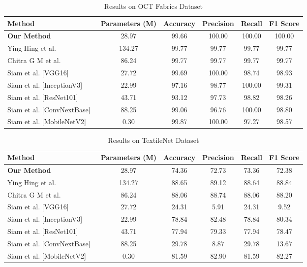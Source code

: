 \begin{table}[h]
\centering
\caption{Results on OCT Fabrics Dataset}
\label{tab:oct_results}
\begin{adjustbox}{max width=\textwidth}
\begin{tabular}{lccccc}
\toprule
\textbf{Method} & \textbf{Parameters (M)} & \textbf{Accuracy} & \textbf{Precision} & \textbf{Recall} & \textbf{F1 Score} \\
\midrule
\textbf{Our Method} & 28.97 & 99.66 & 100.00 & 100.00 & 100.00 \\
Ying Hing et al.~\cite{hong2024research} & 134.27 & 99.77 & 99.77 & 99.77 & 99.77 \\
Chitra G M et al.~\cite{chitra2023fabric} & 86.24 & 99.77 & 99.77 & 99.77 & 99.77 \\
Siam et al. [VGG16]~\cite{siam2023textilenet} & 27.72 & 99.69 & 100.00 & 98.74 & 98.93 \\
Siam et al. [InceptionV3]~\cite{siam2023textilenet} & 22.99 & 97.16 & 98.77 & 100.00 & 99.31 \\
Siam et al. [ResNet101]~\cite{siam2023textilenet} & 43.71 & 93.12 & 97.73 & 98.82 & 98.26 \\
Siam et al. [ConvNextBase]~\cite{siam2023textilenet} & 88.25 & 99.06 & 96.76 & 100.00 & 98.80 \\
Siam et al. [MobileNetV2]~\cite{siam2023textilenet} & 0.30 & 99.87 & 100.00 & 97.27 & 98.57 \\
\bottomrule
\end{tabular}
\end{adjustbox}
\end{table}

\begin{table}[h]
\centering
\caption{Results on TextileNet Dataset}
\label{tab:textilenet_results}
\begin{adjustbox}{max width=\textwidth}
\begin{tabular}{lccccc}
\toprule
\textbf{Method} & \textbf{Parameters (M)} & \textbf{Accuracy} & \textbf{Precision} & \textbf{Recall} & \textbf{F1 Score} \\
\midrule
\textbf{Our Method} & 28.97 & 74.36 & 72.73 & 73.36 & 72.38 \\
Ying Hing et al.~\cite{hong2024research} & 134.27 & 88.65 & 89.12 & 88.64 & 88.84 \\
Chitra G M et al.~\cite{chitra2023fabric} & 86.24 & 88.06 & 88.74 & 88.06 & 88.20 \\
Siam et al. [VGG16]~\cite{siam2023textilenet} & 27.72 & 24.31 & 5.91 & 24.31 & 9.52 \\
Siam et al. [InceptionV3]~\cite{siam2023textilenet} & 22.99 & 78.84 & 82.48 & 78.84 & 80.34 \\
Siam et al. [ResNet101]~\cite{siam2023textilenet} & 43.71 & 77.94 & 79.33 & 77.94 & 78.47 \\
Siam et al. [ConvNextBase]~\cite{siam2023textilenet} & 88.25 & 29.78 & 8.87 & 29.78 & 13.67 \\
Siam et al. [MobileNetV2]~\cite{siam2023textilenet} & 0.30 & 81.59 & 82.90 & 81.59 & 82.27 \\
\bottomrule
\end{tabular}
\end{adjustbox}
\end{table}